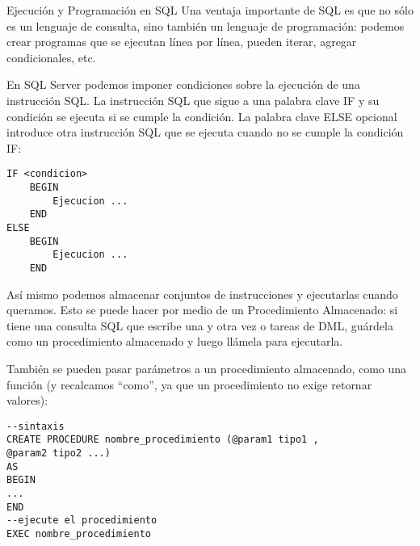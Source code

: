 \begin{frame}[fragile]{Ejecución y Programación en SQL}
\protect\hypertarget{ejecuciuxf3n-y-programaciuxf3n-en-sql}{}
Una ventaja importante de SQL es que no sólo es un lenguaje de consulta,
sino también un lenguaje de programación: podemos crear programas que se
ejecutan línea por línea, pueden iterar, agregar condicionales, etc.

En SQL Server podemos imponer condiciones sobre la ejecución de una
instrucción SQL. La instrucción SQL que sigue a una palabra clave IF y
su condición se ejecuta si se cumple la condición. La palabra clave ELSE
opcional introduce otra instrucción SQL que se ejecuta cuando no se
cumple la condición IF:

\begin{verbatim}
IF <condicion>
    BEGIN
        Ejecucion ...
    END
ELSE
    BEGIN
        Ejecucion ...
    END
\end{verbatim}

Así mismo podemos almacenar conjuntos de instrucciones y ejecutarlas
cuando queramos. Esto se puede hacer por medio de un Procedimiento
Almacenado: si tiene una consulta SQL que escribe una y otra vez o
tareas de DML, guárdela como un procedimiento almacenado y luego llámela
para ejecutarla.

También se pueden pasar parámetros a un procedimiento almacenado, como
una función (y recalcamos ``como'', ya que un procedimiento no exige
retornar valores):

\begin{verbatim}
--sintaxis
CREATE PROCEDURE nombre_procedimiento (@param1 tipo1 ,
@param2 tipo2 ...)
AS
BEGIN
...
END
--ejecute el procedimiento 
EXEC nombre_procedimiento
\end{verbatim}
\end{frame}

